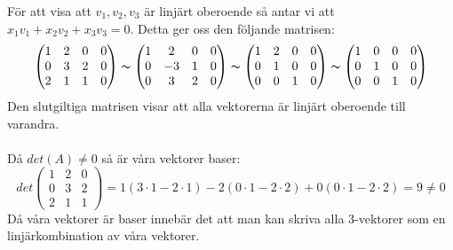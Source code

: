 För att visa att $v_1,v_2,v_3$ är linjärt oberoende så antar vi att $x_1v_1+x_2v_2+x_3v_3=0$.
Detta ger oss den följande matrisen:
\begin{equation*}
    \begin{pmatrix}
        1&2&0&0\\
        0&3&2&0\\
        2&1&1&0
    \end{pmatrix}
    \thicksim
    \begin{pmatrix}
        1&2&0&0\\
        0&-3&1&0\\
        0&3&2&0
    \end{pmatrix}
    \thicksim
    \begin{pmatrix}
        1&2&0&0\\
        0&1&0&0\\
        0&0&1&0
    \end{pmatrix}
    \thicksim
    \begin{pmatrix}
        1&0&0&0\\
        0&1&0&0\\
        0&0&1&0
    \end{pmatrix}
\end{equation*}
Den slutgiltiga matrisen visar att alla vektorerna är linjärt oberoende till varandra.
\\\\
Då $det(A)\neq 0$ så är våra vektorer baser:
\begin{equation*}
    det\begin{pmatrix}
        1&2&0\\
        0&3&2\\
        2&1&1
    \end{pmatrix}
    =1(3\cdot 1-2\cdot 1)-2(0\cdot 1-2\cdot 2)+0(0\cdot 1-2\cdot 2)=9\neq 0
\end{equation*}
Då våra vektorer är baser innebär det att man kan skriva alla 3-vektorer som en linjärkombination av våra vektorer.
